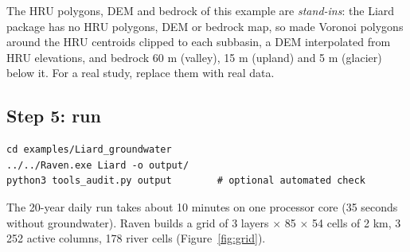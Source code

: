 The HRU polygons, DEM and bedrock of this example are \emph{stand-ins}: the Liard package has no HRU polygons, DEM or
bedrock map, so  made Voronoi polygons around the HRU centroids clipped to each
subbasin, a DEM interpolated from HRU elevations, and bedrock 60 m (valley), 15 m (upland) and 5 m (glacier) below it.
For a real study, replace them with real data.

\subsection{Step 5: run}
\par\noindent\begin{minipage}{\linewidth}
\begin{lstlisting}
cd examples/Liard_groundwater
../../Raven.exe Liard -o output/
python3 tools_audit.py output        # optional automated check
\end{lstlisting}
\end{minipage}\par\smallskip
The 20-year daily run takes about 10 minutes on one processor core (35 seconds without groundwater). Raven builds a grid of
3 layers $\times$ 85 $\times$ 54 cells of 2 km, 3\,252 active columns, 178 river cells (Figure~\ref{fig:grid}).

